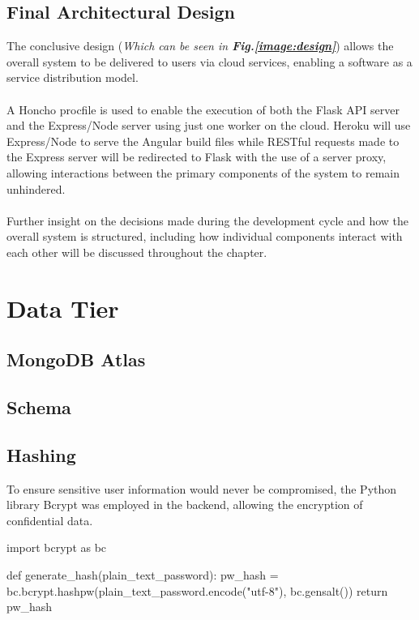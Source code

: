 \subsection{Final Architectural Design}
The conclusive design (\textit{Which can be seen in \textbf{Fig.\ref{image:design}}}) allows the overall system to be delivered to users via cloud services, enabling a software as a service distribution model. 

\paragraph{}
A Honcho procfile is used to enable the execution of both the Flask API server and the Express/Node server using just one worker on the cloud. Heroku will use Express/Node to serve the Angular build files while RESTful requests made to the Express server will be redirected to Flask with the use of a server proxy, allowing interactions between the primary components of the system to remain unhindered.

\paragraph{}
Further insight on the decisions made during the development cycle and how the overall system is structured, including how individual components interact with each other will be discussed throughout the chapter.

\section{Data Tier}
\subsection{MongoDB Atlas}
\subsection{Schema}
\subsection{Hashing}
To ensure sensitive user information would never be compromised, the Python library Bcrypt was employed in the backend, allowing the encryption of confidential data. \newline

\begin{python}[caption=Hashing a Password with Bcrypt]
import bcrypt as bc

def generate_hash(plain_text_password):
    pw_hash = bc.bcrypt.hashpw(plain_text_password.encode("utf-8"), bc.gensalt())
    return pw_hash
\end{python}

